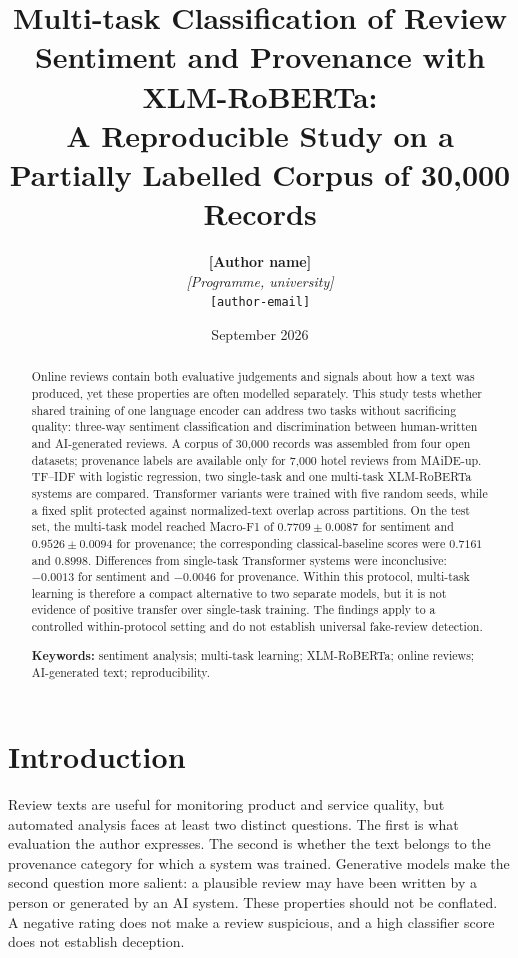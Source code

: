 \documentclass[11pt,a4paper]{article}
\title{Multi-task Classification of Review Sentiment and Provenance with XLM-RoBERTa:\\
A Reproducible Study on a Partially Labelled Corpus of 30,000 Records}
\author{\textbf{[Author name]}\\
\textit{[Programme, university]}\\
\texttt{[author-email]}}
\date{September 2026}
\begin{document}
\maketitle

\begin{abstract}
Online reviews contain both evaluative judgements and signals about how a text was produced, yet these properties are often modelled separately. This study tests whether shared training of one language encoder can address two tasks without sacrificing quality: three-way sentiment classification and discrimination between human-written and AI-generated reviews. A corpus of 30,000 records was assembled from four open datasets; provenance labels are available only for 7,000 hotel reviews from MAiDE-up. TF--IDF with logistic regression, two single-task and one multi-task XLM-RoBERTa systems are compared. Transformer variants were trained with five random seeds, while a fixed split protected against normalized-text overlap across partitions. On the test set, the multi-task model reached Macro-F1 of $0.7709\pm0.0087$ for sentiment and $0.9526\pm0.0094$ for provenance; the corresponding classical-baseline scores were $0.7161$ and $0.8998$. Differences from single-task Transformer systems were inconclusive: $-0.0013$ for sentiment and $-0.0046$ for provenance. Within this protocol, multi-task learning is therefore a compact alternative to two separate models, but it is not evidence of positive transfer over single-task training. The findings apply to a controlled within-protocol setting and do not establish universal fake-review detection.

\medskip
\noindent\textbf{Keywords:} sentiment analysis; multi-task learning; XLM-RoBERTa; online reviews; AI-generated text; reproducibility.
\end{abstract}

\section{Introduction}

Review texts are useful for monitoring product and service quality, but automated analysis faces at least two distinct questions. The first is what evaluation the author expresses. The second is whether the text belongs to the provenance category for which a system was trained. Generative models make the second question more salient: a plausible review may have been written by a person or generated by an AI system. These properties should not be conflated. A negative rating does not make a review suspicious, and a high classifier score does not establish deception.
\end{document}
